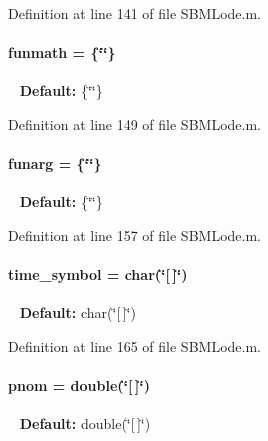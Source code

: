 Definition at line 141 of file S\+B\+M\+Lode.\+m.

\hypertarget{class_s_b_m_lode_a9c1cb6154a226c993c60010300a62e34}{}
\paragraph[{funmath}]{\setlength{\rightskip}{0pt plus 5cm}funmath = \{\char`\"{}\char`\"{}\}}\label{class_s_b_m_lode_a9c1cb6154a226c993c60010300a62e34}
~\newline
{\bfseries Default\+:} \{\char`\"{}\char`\"{}\} 

Definition at line 149 of file S\+B\+M\+Lode.\+m.

\hypertarget{class_s_b_m_lode_ae492d28f363cbbf0c960cab4e8911761}{}
\paragraph[{funarg}]{\setlength{\rightskip}{0pt plus 5cm}funarg = \{\char`\"{}\char`\"{}\}}\label{class_s_b_m_lode_ae492d28f363cbbf0c960cab4e8911761}
~\newline
{\bfseries Default\+:} \{\char`\"{}\char`\"{}\} 

Definition at line 157 of file S\+B\+M\+Lode.\+m.

\hypertarget{class_s_b_m_lode_ac38903669f208bc49c971c7a69f62225}{}
\paragraph[{time\+\_\+symbol}]{\setlength{\rightskip}{0pt plus 5cm}time\+\_\+symbol = char(\char`\"{}\mbox{[}$\,$\mbox{]}\char`\"{})}\label{class_s_b_m_lode_ac38903669f208bc49c971c7a69f62225}
~\newline
{\bfseries Default\+:} char(\char`\"{}\mbox{[}$\,$\mbox{]}\char`\"{}) 

Definition at line 165 of file S\+B\+M\+Lode.\+m.

\hypertarget{class_s_b_m_lode_aab64bc684d10326610cc4e866d7ed65c}{}
\paragraph[{pnom}]{\setlength{\rightskip}{0pt plus 5cm}pnom = double(\char`\"{}\mbox{[}$\,$\mbox{]}\char`\"{})}\label{class_s_b_m_lode_aab64bc684d10326610cc4e866d7ed65c}
~\newline
{\bfseries Default\+:} double(\char`\"{}\mbox{[}$\,$\mbox{]}\char`\"{}) 

